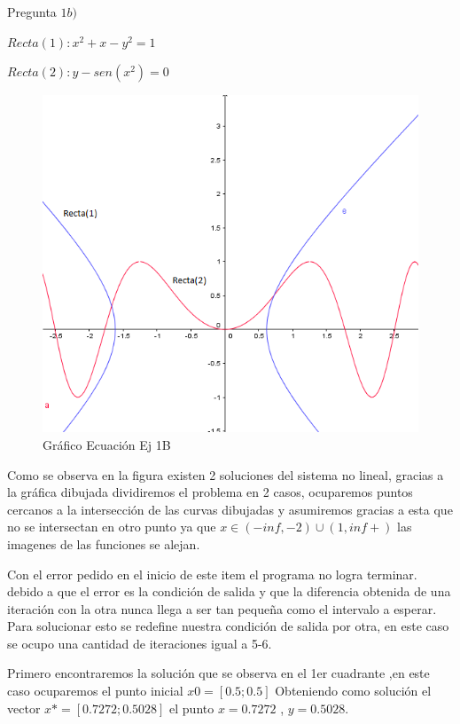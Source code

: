 \documentclass{udpreport}
\begin{document}
\begin{enumerate}
        \newpage    
        Pregunta $ 1b)$
        
            $ Recta(1) : x^2 + x -y^2=1 $
            
            $ Recta(2) : y-sen(x^2)=0  $
            
            \begin{figure}[h] \centering
            \includegraphics[width=12cm]{GraficoEcEj1b}
             \caption{Gráfico Ecuación Ej 1B}
            \end{figure}
        Como se observa en la figura existen 2 soluciones del sistema no lineal, gracias a la gráfica dibujada dividiremos el problema en 2 casos, ocuparemos puntos cercanos a la intersección de las curvas dibujadas y asumiremos gracias a esta que no se intersectan en otro punto ya que  $ x \in (-inf,-2) \cup (1,inf+)$ las imagenes de las funciones se alejan.
        
        Con el error pedido en el inicio de este item el programa no logra terminar. debido a que el error es la condición de salida y que la diferencia  obtenida de una iteración con la otra nunca llega a ser tan pequeña como el intervalo a esperar. Para solucionar esto se redefine nuestra condición de salida por otra, en este caso se ocupo una cantidad de iteraciones igual a 5-6.
        
        Primero encontraremos la solución que se observa en el 1er cuadrante ,en este caso ocuparemos el punto inicial $x0 = [0.5;0.5]$ Obteniendo como solución el vector
        $ x*=[0.7272;0.5028] $ el punto $ x = 0.7272 $ , $ y = 0.5028$.
        

\end{enumerate}
\end{document}
